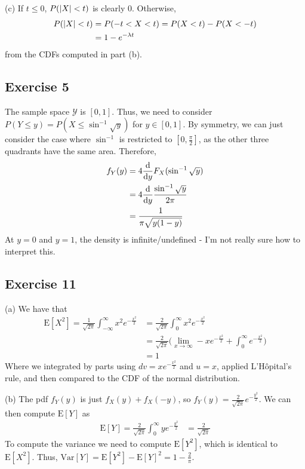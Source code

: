 (c) If $t \leq 0$, $P(\abs{X} < t)$ is clearly 0. Otherwise,
\begin{align*}
        P(\abs{X} < t) &= P(-t < X < t) = P(X < t) - P(X < -t) \\
                       &= 1 - e^{- \lambda t} 
\end{align*}
from the CDFs computed in part (b). 

\subsection{Exercise 5}
The sample space $\mathcal{Y}$ is $[0, 1]$. Thus, we need to consider 
$P(Y \leq y) = P(X \leq \sin^{-1} \sqrt{y})$ for $y \in [0, 1]$. By symmetry, we can just consider the case
where $\sin^{-1}$ is restricted to $[0, \frac{\pi}{2}]$, as the other three quadrants have the same area.
Therefore,
\begin{align*}
        f_Y(y) &= 4 \dv{y} F_X(\sin^{-1} \sqrt{y}) \\
               &= 4 \dv{y} \frac{\sin^{-1} \sqrt{y}}{2\pi} \\
               &= \frac{1}{\pi \sqrt{y (1 - y)}}
\end{align*}
At $y = 0$ and $y = 1$, the density is infinite/undefined - I'm not really sure how to interpret this.

\subsection{Exercise 11}
(a) We have that 
\begin{align*}
        \mathrm{E} [X^2] = \frac{1}{\sqrt{2\pi}}\int_{-\infty}^{\infty} x^2 e^{-\frac{x^2}{2}} &= \frac{2}{\sqrt{2\pi}} \int_{0}^{\infty} x^2 e^{-\frac{x^2}{2}} \\
                                                                            &= \frac{2}{\sqrt{2\pi}} \big(\lim_{x \to \infty} -x e^{-\frac{x^2}{2}} + \int_{0}^{\infty} e^{-\frac{x^2}{2}}\big) \\
                                                                            &= 1
\end{align*}
Where we integrated by parts using $dv = xe^{-\frac{x^2}{2}}$ and $u = x$, applied L'H\^opital's rule, 
and then compared to the CDF of the normal distribution.

(b) The pdf $f_Y(y)$ is just $f_X(y) + f_X(-y)$, so $f_Y(y) = \frac{2}{\sqrt{2\pi}} e^{-\frac{y^2}{2}}$.
We can then compute $\mathrm{E} [Y]$ as
\begin{align*}
        \mathrm{E} [Y] = \frac{2}{\sqrt{2\pi}} \int_{0}^{\infty} y e^{-\frac{y^2}{2}} &= \frac{2}{\sqrt{2\pi}}  
\end{align*}
To compute the variance we need to compute $\mathrm{E} [Y^2]$, which is identical to $\mathrm{E} [X^2]$. Thus, 
$\mathrm{Var} [Y] = \mathrm{E} [Y^2] - \mathrm{E} [Y]^2 = 1 - \frac{2}{\pi}$.
